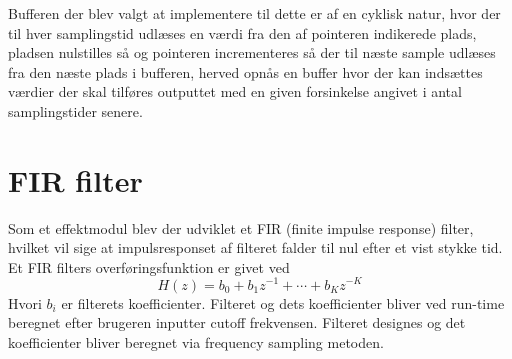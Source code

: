 Bufferen der blev valgt at implementere til dette er af en cyklisk natur, hvor der til hver samplingstid udlæses en værdi fra den af pointeren indikerede plads, pladsen nulstilles så og pointeren incrementeres så der til næste sample udlæses fra den næste plads i bufferen, herved opnås en buffer hvor der kan indsættes værdier der skal tilføres outputtet med en given forsinkelse angivet i antal samplingstider senere. 



\section{FIR filter}
Som et effektmodul blev der udviklet et FIR (finite impulse response) filter, hvilket vil sige at impulsresponset af filteret falder til nul efter et vist stykke tid.\newline
Et FIR filters overføringsfunktion er givet ved
\begin{equation}
H(z) = b_0 + b_1z^{-1} + \cdots + b_Kz^{-K}
\end{equation}
Hvori $b_i$ er filterets koefficienter.\cite[p.218]{Tan2013}\newline
Filteret og dets koefficienter bliver ved run-time beregnet efter brugeren inputter cutoff frekvensen. Filteret designes og det koefficienter bliver beregnet via frequency sampling metoden.
\pagebreak
